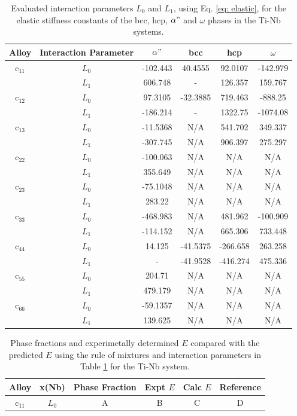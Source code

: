 \newpage
\newpage
\begin{table}[H]
	\caption{Evaluated interaction parameters $L_0$ and $L_1$, using Eq. \ref{eq: elastic}, for the elastic stiffness constants of the bcc, hcp, $\alpha"$ and $\omega$ phases in the Ti-Nb systems.}
	\centering
	\begin{tabular}{ c c c c c c }
		\hline
		Alloy & Interaction Parameter & $\alpha"$ & bcc & hcp & $\omega$\\
		\hline
		c$_{11}$ & $L_{0}$ & -102.443 & 40.4555 & 92.0107 & -142.979 \\
		& $L_{1}$ & 606.748 & - & 126.357 & 159.767 \\
		c$_{12}$ & $L_{0}$ & 97.3105 & -32.3885 & 719.463 & -888.25 \\
		& $L_{1}$ & -186.214 & - & 1322.75 & -1074.08 \\
		c$_{13}$ & $L_{0}$ & -11.5368 & N/A & 541.702 & 349.337 \\
		& $L_{1}$ & -307.745 & N/A & 906.397 & 275.297 \\
		c$_{22}$ & $L_{0}$ & -100.063 & N/A & N/A & N/A \\
		& $L_{1}$ & 355.649 & N/A & N/A & N/A \\
		c$_{23}$ & $L_{0}$ & -75.1048 & N/A & N/A & N/A \\
		& $L_{1}$ & 283.22 & N/A & N/A & N/A \\
		c$_{33}$ & $L_{0}$ & -468.983 & N/A & 481.962 & -100.909 \\
		& $L_{1}$ & -114.152 & N/A & 665.306 & 733.448 \\
		c$_{44}$ & $L_{0}$ & 14.125 & -41.5375 & -266.658 & 263.258 \\
		& $L_{1}$ & - & -41.9528 & -416.274 & 475.336 \\
		c$_{55}$ & $L_{0}$ & 204.71 & N/A & N/A & N/A \\
		& $L_{1}$ & 479.179 & N/A & N/A & N/A \\
		c$_{66}$ & $L_{0}$ & -59.1357 & N/A & N/A & N/A \\
		& $L_{1}$ & 139.625 & N/A & N/A & N/A \\
		\hline
	\end{tabular}
	\label{Ch7-table:intpara}
\end{table}
\clearpage

\newpage
\begin{table}[H]
	\caption{Phase fractions and experimetally determined $E$ compared with the predicted $E$ using the rule of mixtures and interaction parameters in Table \ref{Ch7-table:intpara} for the Ti-Nb system.}
	\centering
	\begin{tabular}{ c c c c c c }
		\hline
		Alloy & x(Nb) & Phase Fraction & Expt $E$ & Calc $E$ & Reference \\
		\hline
		c$_{11}$ & $L_{0}$ & A & B & C & D \\
		
		\hline
	\end{tabular}
	\label{Ch7-table:elasexptdata}
\end{table}
\clearpage

